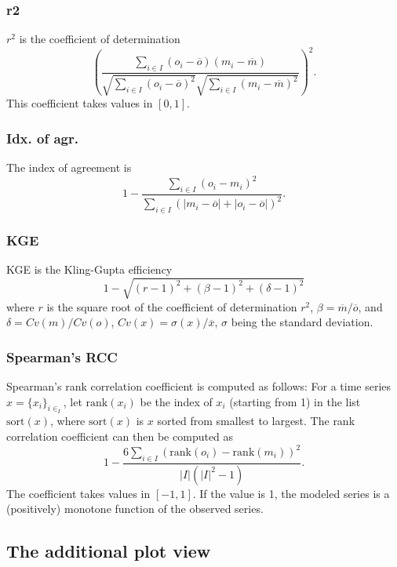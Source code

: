 \documentclass[11pt]{article}
\theoremstyle{definition}
\begin{document}
\subsubsection{r2}
$r^2$ is the coefficient of determination
\[
\left(\frac{\sum_{i\in I}(o_i-\overline{o})(m_i-\overline{m})}{\sqrt{\sum_{i\in I}(o_i-\overline{o})^2}\sqrt{\sum_{i\in I}(m_i-\overline{m})^2}}\right)^2.
\]
This coefficient takes values in $[0, 1]$.

\subsubsection{Idx. of agr.}
The index of agreement is
\[
1 - \frac{\sum_{i\in I}(o_i-m_i)^2}{\sum_{i\in I}(|m_i-\overline{o}| + |o_i-\overline{o}|)^2}.
\]

\subsubsection{KGE}
KGE is the Kling-Gupta efficiency \cite{klinggupta09}
\[
1 - \sqrt{(r-1)^2 + (\beta-1)^2 + (\delta-1)^2}
\]
where $r$ is the square root of the coefficient of determination $r^2$, $\beta=\overline{m}/\overline{o}$, and $\delta=Cv(m)/Cv(o)$, $Cv(x)=\sigma(x)/\overline{x}$, $\sigma$ being the standard deviation.

\subsubsection{Spearman's RCC}
Spearman's rank correlation coefficient \cite{spearman04} is computed as follows: For a time series $x=\{x_i\}_{i\in_I}$, let $\mathrm{rank}(x_i)$ be the index of $x_i$ (starting from 1) in the list $\mathrm{sort}(x)$, where $\mathrm{sort}(x)$ is $x$ sorted from smallest to largest. The rank correlation coefficient can then be computed as
\[
1 - \frac{6\sum_{i\in I}(\mathrm{rank}(o_i)-\mathrm{rank}(m_i))^2}{|I|(|I|^2 - 1)}.
\]
The coefficient takes values in $[-1, 1]$. If the value is 1, the modeled series is a (positively) monotone function of the observed series.

\subsection{The additional plot view}\label{sec:additionalplotview}
\end{document}
